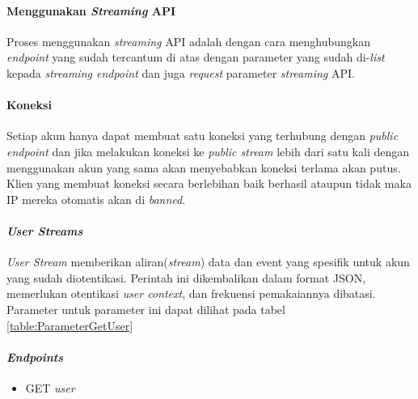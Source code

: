 \paragraph{Menggunakan \textit{Streaming} API}
Proses menggunakan \textit{streaming} API adalah dengan cara menghubungkan \textit{endpoint} yang sudah tercantum di atas dengan parameter yang sudah di-\textit{list} kepada \textit{streaming endpoint} dan juga \textit{request} parameter \textit{streaming} API.

\paragraph{Koneksi}
Setiap akun hanya dapat membuat satu koneksi yang terhubung dengan \textit{public endpoint} dan jika melakukan koneksi ke \textit{public stream} lebih dari satu kali dengan menggunakan akun yang sama akan menyebabkan koneksi terlama akan putus. Klien yang membuat koneksi secara berlebihan baik berhasil ataupun tidak maka IP mereka otomatis akan di \textit{banned}.

\paragraph{\textit{User Streams}}
\textit{User Stream} memberikan aliran(\textit{stream}) data dan event yang spesifik untuk akun yang sudah diotentikasi. Perintah ini dikembalikan dalam format JSON, memerlukan otentikasi \textit{user context}, dan frekuensi pemakaiannya dibatasi. Parameter untuk parameter ini dapat dilihat pada tabel \ref{table:ParameterGetUser}


\paragraph{\textit{Endpoints}}
\begin{itemize}
	\item GET \textit{user}
\end{itemize}

